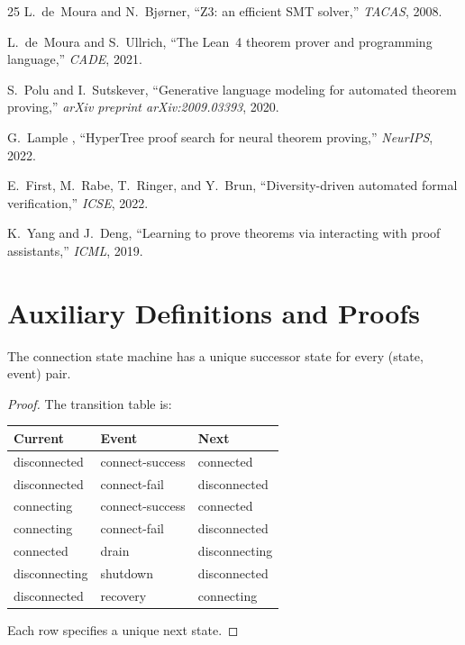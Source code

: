 \documentclass[11pt]{article}
\begin{document}
\begin{thebibliography}{25}
L.~de~Moura and N.~Bj{\o}rner,
``Z3: an efficient SMT solver,''
\emph{TACAS}, 2008.

L.~de~Moura and S.~Ullrich,
``The Lean~4 theorem prover and programming language,''
\emph{CADE}, 2021.

S.~Polu and I.~Sutskever,
``Generative language modeling for automated theorem proving,''
\emph{arXiv preprint arXiv:2009.03393}, 2020.

G.~Lample \etal{},
``HyperTree proof search for neural theorem proving,''
\emph{NeurIPS}, 2022.

E.~First, M.~Rabe, T.~Ringer, and Y.~Brun,
``Diversity-driven automated formal verification,''
\emph{ICSE}, 2022.

K.~Yang and J.~Deng,
``Learning to prove theorems via interacting with proof
assistants,''
\emph{ICML}, 2019.

\end{thebibliography}

\appendix

\section{Auxiliary Definitions and Proofs}\label{app:proofs}

\begin{lemma}%
\label{lem:conndeterm}
The connection state machine has a unique successor state
for every (state, event) pair.
\end{lemma}
\begin{proof}
The transition table is:
\begin{center}
\begin{tabular}{lll}
\textbf{Current} & \textbf{Event} & \textbf{Next} \\
\hline
disconnected & connect-success & connected \\
disconnected & connect-fail & disconnected \\
connecting & connect-success & connected \\
connecting & connect-fail & disconnected \\
connected & drain & disconnecting \\
disconnecting & shutdown & disconnected \\
disconnected & recovery & connecting \\
\end{tabular}
\end{center}
Each row specifies a unique next state.
\end{proof}
\end{document}
